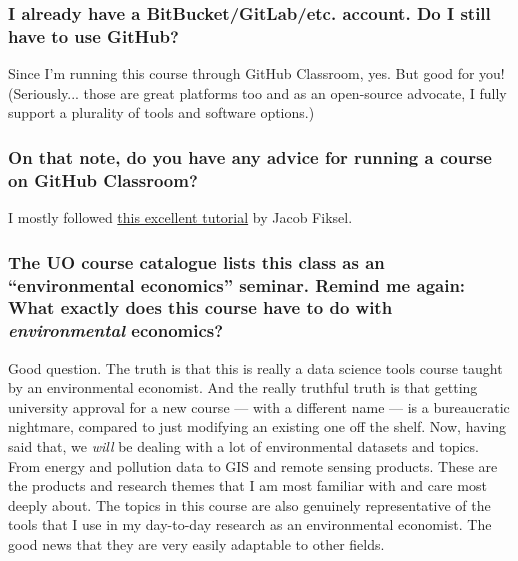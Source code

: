 \documentclass[12]{article}
\begin{document}
\vspace{-0.25cm}
\subsubsection*{I already have a BitBucket/GitLab/etc. account. Do I still have to use GitHub?}
Since I'm running this course through GitHub Classroom, yes. But good for you! (Seriously... those are great platforms too and as an open-source advocate, I fully support a plurality of tools and software options.)

\vspace{-0.25cm}
\subsubsection*{On that note, do you have any advice for running a course on GitHub Classroom?}
I mostly followed \href{https://github.com/jfiksel/github-classroom-for-teachers}{this excellent tutorial} by Jacob Fiksel.

\vspace{-0.25cm}
\subsubsection*{The UO course catalogue lists this class as an ``environmental economics'' seminar. Remind me again: What exactly does this course have to do with \textit{environmental} economics?}
Good question. The truth is that this is really a data science tools course taught by an environmental economist. And the really truthful truth is that getting university approval for a new course --- with a different name --- is a bureaucratic nightmare, compared to just modifying an existing one off the shelf. Now, having said that, we \textit{will} be dealing with a lot of environmental datasets and topics. From energy and pollution data to GIS and remote sensing products. These are the products and research themes that I am most familiar with and care most deeply about. The topics in this course are also genuinely representative of the tools that I use in my day-to-day research as an environmental economist. The good news that they are very easily adaptable to other fields.
\end{document}
